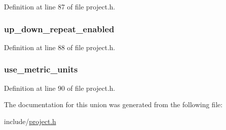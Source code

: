 \-Definition at line 87 of file project.\-h.

\hypertarget{unions__system__flags_a47613fdc4c935cabe322cb63cac9150d}{
\subsubsection[{up\-\_\-down\-\_\-repeat\-\_\-enabled}]{ {\bf up\-\_\-down\-\_\-repeat\-\_\-enabled}}}\label{unions__system__flags_a47613fdc4c935cabe322cb63cac9150d}


\-Definition at line 88 of file project.\-h.

\hypertarget{unions__system__flags_a98d55100d4348e9980fe36505551b5d8}{
\subsubsection[{use\-\_\-metric\-\_\-units}]{ {\bf use\-\_\-metric\-\_\-units}}}\label{unions__system__flags_a98d55100d4348e9980fe36505551b5d8}


\-Definition at line 90 of file project.\-h.



\-The documentation for this union was generated from the following file\-:\begin{DoxyCompactItemize}
\item 
include/\hyperlink{project_8h}{project.\-h}\end{DoxyCompactItemize}
